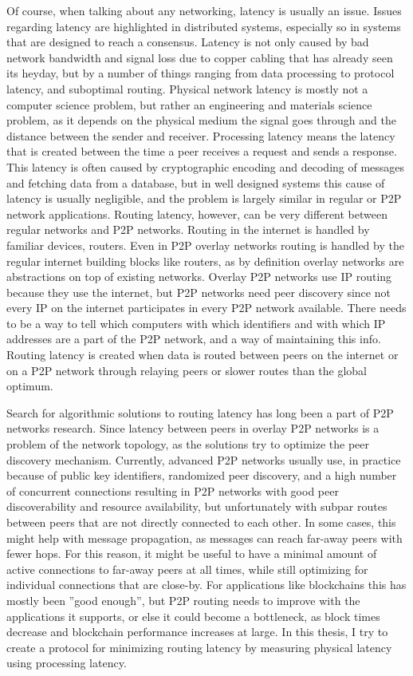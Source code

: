 Of course, when talking about any networking, latency is usually an issue. Issues regarding latency are highlighted in distributed systems, especially so in systems that are designed to reach a consensus. Latency is not only caused by bad network bandwidth and signal loss due to copper cabling that has already seen its heyday, but by a number of things ranging from data processing to protocol latency, and suboptimal routing. Physical network latency is mostly not a computer science problem, but rather an engineering and materials science problem, as it depends on the physical medium the signal goes through and the distance between the sender and receiver. Processing latency means the latency that is created between the time a peer receives a request and sends a response. This latency is often caused by cryptographic encoding and decoding of messages and fetching data from a database, but in well designed systems this cause of latency is usually negligible, and the problem is largely similar in regular or P2P network applications. Routing latency, however, can be very different between regular networks and P2P networks. Routing in the internet is handled by familiar devices, routers. Even in P2P overlay networks routing is handled by the regular internet building blocks like routers, as by definition overlay networks are abstractions on top of existing networks. Overlay P2P networks use IP routing because they use the internet, but P2P networks need peer discovery since not every IP on the internet participates in every P2P network available. There needs to be a way to tell which computers with which identifiers and with which IP addresses are a part of the P2P network, and a way of maintaining this info. Routing latency is created when data is routed between peers on the internet or on a P2P network through relaying peers or slower routes than the global optimum.

Search for algorithmic solutions to routing latency has long been a part of P2P networks research. Since latency between peers in overlay P2P networks is a problem of the network topology, as  the solutions try to optimize the peer discovery mechanism. Currently, advanced P2P networks usually use, in practice because of public key identifiers, randomized peer discovery, and a high number of concurrent connections resulting in P2P networks with good peer discoverability and resource availability, but unfortunately with subpar routes between peers that are not directly connected to each other. In some cases, this might help with message propagation, as messages can reach far-away peers with fewer hops. For this reason, it might be useful to have a minimal amount of active connections to far-away peers at all times, while still optimizing for individual connections that are close-by. For applications like blockchains this has mostly been ''good enough'', but P2P routing needs to improve with the applications it supports, or else it could become a bottleneck, as block times decrease and blockchain performance increases at large. In this thesis, I try to create a protocol for minimizing routing latency by measuring physical latency using processing latency.

